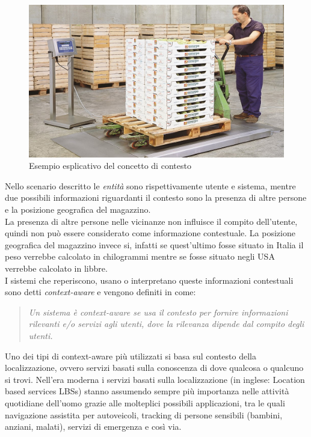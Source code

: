 \begin{figure}[H]  
	\centering 
	\includegraphics[scale=0.4 ]{ContestoApplicativo/bilancia.jpg}
	\caption{Esempio esplicativo del concetto di contesto}
	\label{fig:context}
\end{figure}
Nello scenario descritto le \textit{entità} sono rispettivamente utente e sistema, mentre due possibili informazioni riguardanti il contesto sono la presenza di altre persone e la posizione geografica del magazzino.\\
La presenza di altre persone nelle vicinanze non influisce il compito dell'utente, quindi non può essere considerato come informazione contestuale. La posizione geografica del magazzino invece si, infatti se quest'ultimo fosse situato in Italia il peso verrebbe calcolato in chilogrammi mentre se fosse situato negli USA verrebbe calcolato in libbre.\\
I sistemi che reperiscono, usano o interpretano queste informazioni contestuali sono detti \textit{context-aware} e vengono definiti in \cite{context} come:
\begin{quotation}
	\textit{Un sistema è context-aware se usa il contesto per fornire informazioni rilevanti e/o servizi agli utenti, dove la rilevanza dipende dal compito degli utenti.}
\end{quotation}
Uno dei tipi di context-aware più utilizzati si basa sul contesto della localizzazione, ovvero servizi basati sulla conoscenza di dove qualcosa o qualcuno si trovi. Nell'era moderna i servizi basati sulla localizzazione (in inglese: Location based services LBSs) stanno assumendo sempre più importanza nelle attività quotidiane dell'uomo grazie alle molteplici possibili applicazioni, tra le quali navigazione assistita per autoveicoli, tracking di persone sensibili (bambini, anziani, malati), servizi di emergenza e così via.\\
